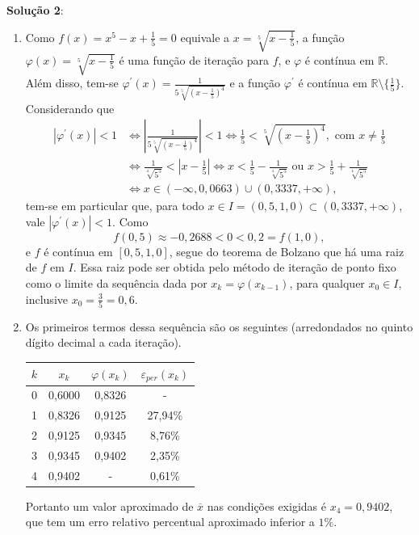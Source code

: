 \documentclass[12pt,a4paper]{article}
\begin{document}
\begin{ExerciseList}
\textbf{Solução 2}:

\begin{enumerate}
\item Como $f(x) = x^5 - x + \frac{1}{5} = 0$ equivale a $x = \sqrt[5]{x- \frac{1}{5}}$, a função $\varphi(x) = \sqrt[5]{x- \frac{1}{5}}$ é uma função de iteração para $f$, e $\varphi$ é contínua em $\mathbb{R}$. Além disso, tem-se $\varphi^\prime(x) = \frac{1}{5\sqrt[5]{\left(x- \frac{1}{5}\right)^4}}$ e a função $\varphi^\prime$ é contínua em $\mathbb{R}\setminus \{\frac{1}{5}\}$. Considerando que
\begin{align*}
  |\varphi^\prime(x)| < 1
  & \Leftrightarrow
  \left| \frac{1}{5\sqrt[5]{\left(x- \frac{1}{5}\right)^4}} \right| < 1
  \Leftrightarrow
  \frac{1}{5} < \sqrt[5]{\left(x- \frac{1}{5}\right)^4}, \text{ com } x \neq \frac{1}{5}\\
  & \Leftrightarrow
  \frac{1}{\sqrt[4]{5^5}} < \left|x- \frac{1}{5}\right|
  \Leftrightarrow
  x < \frac{1}{5} - \frac{1}{\sqrt[4]{5^5}}
  \text{ ou }
  x > \frac{1}{5} + \frac{1}{\sqrt[4]{5^5}} \\
  & \Leftrightarrow
  x \in \left(-\infty, 0,0663\right)
    \cup \left(0,3337, +\infty\right),
\end{align*}
tem-se em particular que, para todo $x \in I = (0,5, 1,0) \subset \left(0,3337, +\infty\right)$, vale $|\varphi^\prime(x)| < 1$. Como
\[
f(0,5) \approx -0,2688 < 0 < 0,2 = f(1,0),
\]
e $f$ é contínua em $[0,5, 1,0]$, segue do teorema de Bolzano que há uma raiz de $f$ em $I$. Essa raiz pode ser obtida pelo método de iteração de ponto fixo como o limite da sequência dada por $x_k = \varphi(x_{k-1})$, para qualquer $x_0 \in I$, inclusive $x_0 = \frac{3}{5} = 0,6$.

\item Os primeiros termos dessa sequência são os seguintes (arredondados no quinto dígito decimal a cada iteração).

\begin{center}
\begin{tabular}{cccc}
\hline
$k$ & $x_k$ & $\varphi(x_k)$ & $\varepsilon_{per}(x_k)$\\
\hline
0 & 0,6000 & 0,8326 & - \\
1 & 0,8326 & 0,9125 & 27,94\% \\
2 & 0,9125 & 0,9345 &  8,76\% \\
3 & 0,9345 & 0,9402 &  2,35\% \\
4 & 0,9402 & - &  0,61\% \\
\hline
\end{tabular}
\end{center}
Portanto um valor aproximado de $\overline{x}$ nas condições exigidas é $x_4 = 0,9402$, que tem um erro relativo percentual aproximado inferior a $1\%$.
\end{enumerate}


\end{ExerciseList}
\end{document}
